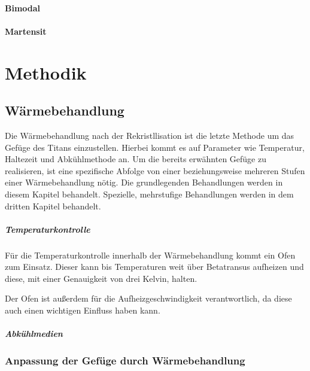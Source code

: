 \documentclass[a4paper, 11pt]{tubsreprt}
\begin{document}
\subsubsection{Bimodal}
\subsubsection{Martensit}
\chapter{Methodik}
\section{Wärmebehandlung}

Die Wärmebehandlung nach der Rekristllisation ist die letzte Methode um das Gefüge des Titans einzustellen. Hierbei kommt es auf Parameter wie Temperatur, Haltezeit und Abkühlmethode an. Um die bereits erwähnten Gefüge zu realisieren, ist eine spezifische Abfolge von einer beziehungsweise mehreren Stufen einer Wärmebehandlung nötig. Die grundlegenden Behandlungen werden in diesem Kapitel behandelt. Spezielle, mehrstufige Behandlungen werden in dem dritten Kapitel behandelt.
\paragraph{Temperaturkontrolle}
Für die Temperaturkontrolle innerhalb der Wärmebehandlung kommt ein Ofen zum Einsatz. Dieser kann bis Temperaturen weit über Betatransus aufheizen und diese, mit einer Genauigkeit von drei Kelvin, halten. 

Der Ofen ist außerdem für die Aufheizgeschwindigkeit verantwortlich, da diese auch einen wichtigen Einfluss haben kann.
\paragraph{Abkühlmedien}
\subsection*{Anpassung der Gefüge durch Wärmebehandlung}


\end{document}

